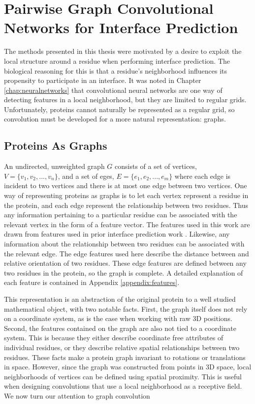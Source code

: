 \chapter{Pairwise Graph Convolutional Networks for Interface Prediction}
\label{chap:methods}

The methods presented in this thesis were motivated by a desire to exploit the local structure around a residue when performing interface prediction.
The biological reasoning for this is that a residue's neighborhood influences its propensity to participate in an interface.
It was noted in Chapter \ref{chap:neuralnetworks} that convolutional neural networks are one way of detecting features in a local neighborhood, but they are limited to regular grids. 
Unfortunately, proteins cannot naturally be represented as a regular grid, so convolution must be developed for a more natural representation: graphs.


\section{Proteins As Graphs}

An undirected, unweighted graph $G$ consists of a set of vertices, $V=\{v_1, v_2, ..., v_n\}$, and a set of eges, $E=\{e_1, e_2, ..., e_m\}$ where each edge is incident to two vertices and there is at most one edge between two vertices.
One way of representing proteins as graphs is to let each vertex represent a residue in the protein, and each edge represent the relationship between two residues.
Thus any information pertaining to a particular residue can be associated with the relevant vertex in the form of a feature vector.
The features used in this work are drawn from features used in prior interface prediction work \cite{minhas2014}.
Likewise, any information about the relationship between two residues can be associated with the relevant edge.
The edge features used here describe the distance between and relative orientation of two residues.
These edge features are defined between any two residues in the protein, so the graph is complete. 
A detailed explanation of each feature is contained in Appendix \ref{appendix:features}.

This representation is an abstraction of the original protein to a well studied mathematical object, with two notable facts.
First, the graph itself does not rely on a coordinate system, as is the case when working with raw 3D positions.
Second, the features contained on the graph are also not tied to a coordinate system.
This is because they either describe coordinate free attributes of individual residues, or they describe relative spatial relationships between two residues.
These facts make a protein graph invariant to rotations or translations in space.
However, since the graph was constructed from points in 3D space, local neighborhoods of vertices can be defined using spatial proximity.
This is useful when designing convolutions that use a local neighborhood as a receptive field.
We now turn our attention to graph convolution

